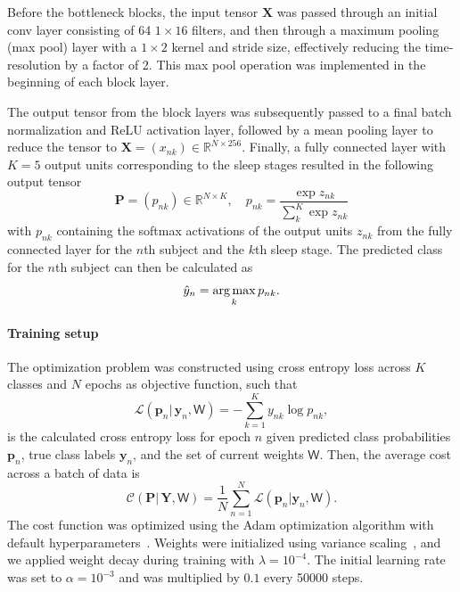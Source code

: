 Before the bottleneck blocks, the input tensor $\mathbf{X}$ was passed through an initial conv layer consisting of 64 $1\times16$ filters, and then through a maximum pooling (max pool) layer with a $1\times2$ kernel and stride size, effectively reducing the time-resolution by a factor of 2.
This max pool operation was implemented in the beginning of each block layer.

The output tensor from the block layers was subsequently passed to a final batch normalization and ReLU activation layer, followed by a mean pooling layer to reduce the tensor to $\mathbf{X} = \left(x_{nk}\right) \in \mathbb{R}^{N\times 256}$.
Finally, a fully connected layer with $K=5$ output units corresponding to the sleep stages resulted in the following output tensor
\begin{equation}
    \mathbf{P} = \left(p_{nk}\right) \in \mathbb{R}^{N \times K}, \quad p_{nk} = \frac{\exp{z_{nk}}}{\sum_{k}^{K} \exp z_{nk}}
\end{equation}
with $p_{nk}$ containing the softmax activations of the output units $z_{nk}$ from the fully connected layer for the $n$th subject and the $k$th sleep stage.
The predicted class for the $n$th subject can then be calculated as
\begin{equation}\label{eq:argmax}
    \hat{y}_n = \operatorname*{arg\,max}_{k} p_{nk}.
\end{equation}

\paragraph{Training setup}
The optimization problem was constructed using cross entropy loss across $K$ classes and $N$ epochs as objective function, such that
\begin{equation}
    \mathcal{L}(\mathbf{p}_{n} |\, \mathbf{y}_{n},\mathsf{W}) = -\sum_{k=1}^{K}{y_{nk}\log{p_{nk}}},
\end{equation}
is the calculated cross entropy loss for epoch $n$ given predicted class probabilities $\mathbf{p}_n$, true class labels $\mathbf{y}_n$, and the set of current weights $\mathsf{W}$.
Then, the average cost across a batch of data is
\begin{equation}
    \mathcal{C}(\mathbf{P} |\, \mathbf{Y},\mathsf{W}) = \frac{1}{N}\sum_{n=1}^{N}{\mathcal{L}(\mathbf{p}_{n} | \mathbf{y}_{n},\mathsf{W})}\label{eq:cost}.
\end{equation}
The cost function was optimized using the Adam optimization algorithm with default hyperparameters~\cite{Kingma2015}.
Weights were initialized using variance scaling~\cite{He2015a}, and we applied weight decay during training with $\lambda=10^{-4}$.
The initial learning rate was set to $\alpha=10^{-3}$ and was multiplied by $0.1$ every 50000 steps.

